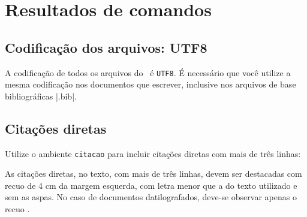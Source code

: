 
 
\chapter{Resultados de comandos}\label{cap_exemplos}


\section{Codificação dos arquivos: UTF8}

A codificação de todos os arquivos do \abnTeX\ é \texttt{UTF8}. É necessário que
você utilize a mesma codificação nos documentos que escrever, inclusive nos
arquivos de base bibliográficas |.bib|.

\section{Citações diretas}
\label{sec-citacao}

Utilize o ambiente \texttt{citacao} para incluir
citações diretas com mais de três linhas:

\begin{citacao}
As citações diretas, no texto, com mais de três linhas, devem ser
destacadas com recuo de 4 cm da margem esquerda, com letra menor que a do texto
utilizado e sem as aspas. No caso de documentos datilografados, deve-se
observar apenas o recuo \cite[5.3]{NBR10520:2023}.
\end{citacao}

